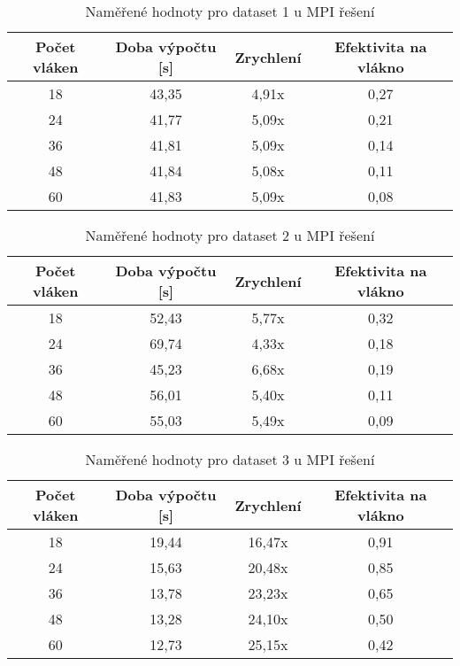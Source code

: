 \documentclass[a4paper,10pt]{article}
\begin{document}
\begin{table}[H]
\centering
\begin{tabular}{|c|c|c|c|}
\hline
Počet vláken & Doba výpočtu {[}s{]} & Zrychlení & Efektivita na vlákno \\ \hline
18           & 43,35                & 4,91x     & 0,27                 \\
24           & 41,77                & 5,09x     & 0,21                 \\
36           & 41,81                & 5,09x     & 0,14                 \\
48           & 41,84                & 5,08x     & 0,11                 \\
60           & 41,83                & 5,09x     & 0,08                 \\ \hline
\end{tabular}
\caption{Naměřené hodnoty pro dataset 1 u MPI řešení}
\end{table}

\begin{table}[H]
\centering
\begin{tabular}{|c|c|c|c|}
\hline
Počet vláken & Doba výpočtu {[}s{]} & Zrychlení & Efektivita na vlákno \\ \hline
18           & 52,43                & 5,77x     & 0,32                 \\
24           & 69,74                & 4,33x     & 0,18                 \\
36           & 45,23                & 6,68x     & 0,19                 \\
48           & 56,01                & 5,40x     & 0,11                 \\
60           & 55,03                & 5,49x     & 0,09                 \\ \hline
\end{tabular}
\caption{Naměřené hodnoty pro dataset 2 u MPI řešení}
\end{table}

\begin{table}[H]
\centering
\begin{tabular}{|c|c|c|c|}
\hline
Počet vláken & Doba výpočtu {[}s{]} & Zrychlení & Efektivita na vlákno \\ \hline
18           & 19,44                & 16,47x    & 0,91                 \\
24           & 15,63                & 20,48x    & 0,85                 \\
36           & 13,78                & 23,23x    & 0,65                 \\
48           & 13,28                & 24,10x    & 0,50                 \\
60           & 12,73                & 25,15x    & 0,42                 \\ \hline
\end{tabular}
\caption{Naměřené hodnoty pro dataset 3 u MPI řešení}
\end{table}
\end{document}
